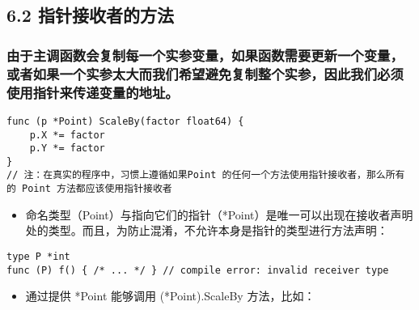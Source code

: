 \hypertarget{ux6307ux9488ux63a5ux6536ux8005ux7684ux65b9ux6cd5}{%
\subsection{6.2
指针接收者的方法}\label{ux6307ux9488ux63a5ux6536ux8005ux7684ux65b9ux6cd5}}

\hypertarget{ux7531ux4e8eux4e3bux8c03ux51fdux6570ux4f1aux590dux5236ux6bcfux4e00ux4e2aux5b9eux53c2ux53d8ux91cfux5982ux679cux51fdux6570ux9700ux8981ux66f4ux65b0ux4e00ux4e2aux53d8ux91cfux6216ux8005ux5982ux679cux4e00ux4e2aux5b9eux53c2ux592aux5927ux800cux6211ux4eecux5e0cux671bux907fux514dux590dux5236ux6574ux4e2aux5b9eux53c2ux56e0ux6b64ux6211ux4eecux5fc5ux987bux4f7fux7528ux6307ux9488ux6765ux4f20ux9012ux53d8ux91cfux7684ux5730ux5740}{%
\subsubsection{由于主调函数会复制每一个实参变量，如果函数需要更新一个变量，或者如果一个实参太大而我们希望避免复制整个实参，因此我们必须使用指针来传递变量的地址。}\label{ux7531ux4e8eux4e3bux8c03ux51fdux6570ux4f1aux590dux5236ux6bcfux4e00ux4e2aux5b9eux53c2ux53d8ux91cfux5982ux679cux51fdux6570ux9700ux8981ux66f4ux65b0ux4e00ux4e2aux53d8ux91cfux6216ux8005ux5982ux679cux4e00ux4e2aux5b9eux53c2ux592aux5927ux800cux6211ux4eecux5e0cux671bux907fux514dux590dux5236ux6574ux4e2aux5b9eux53c2ux56e0ux6b64ux6211ux4eecux5fc5ux987bux4f7fux7528ux6307ux9488ux6765ux4f20ux9012ux53d8ux91cfux7684ux5730ux5740}}

\begin{verbatim}
func (p *Point) ScaleBy(factor float64) {
    p.X *= factor
    p.Y *= factor
}
// 注：在真实的程序中，习惯上遵循如果Point 的任何一个方法使用指针接收者，那么所有的 Point 方法都应该使用指针接收者
\end{verbatim}

\begin{itemize}
\tightlist
\item
  命名类型（Point）与指向它们的指针（*Point）是唯一可以出现在接收者声明处的类型。而且，为防止混淆，不允许本身是指针的类型进行方法声明：
\end{itemize}

\begin{verbatim}
type P *int
func (P) f() { /* ... */ } // compile error: invalid receiver type
\end{verbatim}

\begin{itemize}
\tightlist
\item
  通过提供 *Point 能够调用 (*Point).ScaleBy 方法，比如：
\end{itemize}

